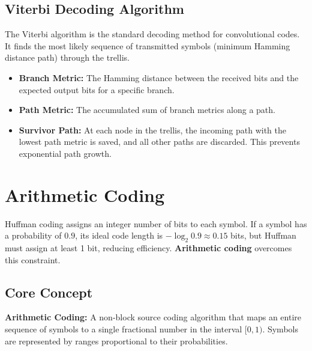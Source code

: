 \documentclass[12pt,a4paper]{article}
\begin{document}
\subsection{Viterbi Decoding Algorithm}
The Viterbi algorithm is the standard decoding method for convolutional codes. It finds the most likely sequence of transmitted symbols (minimum Hamming distance path) through the trellis.
\begin{itemize}[leftmargin=*, itemsep=3.5pt]
  \item \textbf{Branch Metric:} The Hamming distance between the received bits and the expected output bits for a specific branch.
  \item \textbf{Path Metric:} The accumulated sum of branch metrics along a path.
  \item \textbf{Survivor Path:} At each node in the trellis, the incoming path with the lowest path metric is saved, and all other paths are discarded. This prevents exponential path growth.
\end{itemize}

\section{Arithmetic Coding}

Huffman coding assigns an integer number of bits to each symbol. If a symbol has a probability of $0.9$, its ideal code length is $-\log_2 0.9 \approx 0.15$ bits, but Huffman must assign at least 1 bit, reducing efficiency. \textbf{Arithmetic coding} overcomes this constraint.

\subsection{Core Concept}
\begin{tcolorbox}[defbox]
\textbf{Arithmetic Coding:} A non-block source coding algorithm that maps an entire sequence of symbols to a single fractional number in the interval $[0, 1)$. Symbols are represented by ranges proportional to their probabilities.
\end{tcolorbox}
\end{document}
